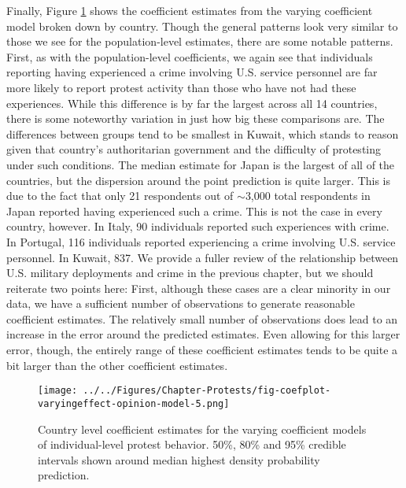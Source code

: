 Finally, Figure \ref{fig:coefplot-varying-coefficients} shows the coefficient estimates from the varying coefficient model broken down by country. Though the general patterns look very similar to those we see for the population-level estimates, there are some notable patterns. First, as with the population-level coefficients, we again see that individuals reporting having experienced a crime involving U.S. service personnel are far more likely to report protest activity than those who have not had these experiences. While this difference is by far the largest across all 14 countries, there is some noteworthy variation in just how big these comparisons are. The differences between groups tend to be smallest in Kuwait, which stands to reason given that country's authoritarian government and the difficulty of protesting under such conditions.  The median estimate for Japan is the largest of all of the countries, but the dispersion around the point prediction is quite larger. This is due to the fact that only 21 respondents out of $\sim$3,000 total respondents in Japan reported having experienced such a crime. This is not the case in every country, however. In Italy, 90 individuals reported such experiences with crime. In Portugal, 116 individuals reported experiencing a crime involving U.S. service personnel. In Kuwait, 837. We provide a fuller review of the relationship between U.S. military deployments and crime in the previous chapter, but we should reiterate two points here: First, although these cases are a clear minority in our data, we have a sufficient number of observations to generate reasonable coefficient estimates. The relatively small number of observations does lead to an increase in the error around the predicted estimates. Even allowing for this larger error, though, the entirely range of these coefficient estimates tends to be quite a bit larger than the other coefficient estimates. 




\begin{figure}[t]
	\centering\texttt{[image: ../../Figures/Chapter-Protests/fig-coefplot-varyingeffect-opinion-model-5.png]}
	\caption{Country level coefficient estimates for the varying coefficient models of individual-level protest behavior. 50\%, 80\% and 95\% credible intervals shown around median highest density probability prediction.}
	\label{fig:coefplot-varying-coefficients}
\end{figure}

